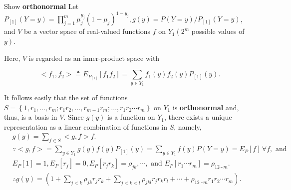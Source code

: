 \documentclass[UTF8,a4paper,10pt]{article}
\begin{document}
\begin{Problem}[]{Show  \textbf{orthonormal}}
Let $P_{[1]}(Y=y)=\prod_{j=1}^m \mu_j^{y_j}\left(1-\mu_j\right)^{1-y_j}, g(y)=P(Y=y) / P_{[1]}(Y=y)$, and $V$ be a vector space of real-valued functions $f$ on $Y_1\left(2^m\right.$ possible values of $\left.y\right)$. 

Here, $V$ is regarded as an inner-product space with

\[ <f_1, f_2>\triangleq E_{P_{[1]}}\left[f_1 f_2\right]=\sum_{y \in Y_1} f_1(y) f_2(y) P_{[1]}(y).\]

It follows easily that the set of functions $S=\left\{1, r_1, \ldots, r_m ; r_1 r_2, \ldots, r_{m-1} r_m ; \ldots, r_1 r_2 \cdots r_m\right\}$ on $Y_1$ is \textbf{orthonormal} and, thus, is a basis in $V$.
 Since $g(y)$ is a function on $Y_1$, there exists a unique representation as a linear combination of functions in $S$, namely,
$$
\begin{aligned}
& g(y)=\sum_{f \in S}<g, f>f . \\
& \because<g, f>=\sum_{y \in Y_1} g(y) f(y) P_{[1]}(y)=\sum_{y \in Y_1} f(y) P(Y=y)=E_P[f] \,\forall f, \text { and } \\
& E_P[1]=1, E_P\left[r_j\right]=0, E_P\left[r_j r_k\right]=\rho_{j k}, \cdots, \text { and } E_P\left[r_1 \cdots r_m\right]=\rho_{12 \cdots m} . \\
& \therefore g(y)=\left(1+\sum_{j<k} \rho_{j k} r_j r_k+\sum_{j<k<l} \rho_{j k l} r_j r_k r_l+\cdots+\rho_{12 \cdots m} r_1 r_2 \cdots r_m\right) .
\end{aligned}
$$
\end{Problem}

\pagebreak

\end{document}
